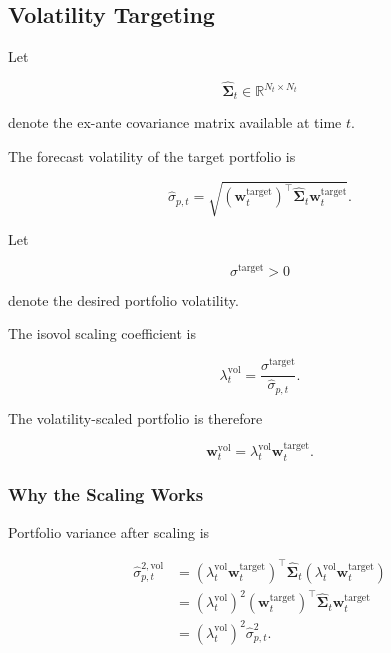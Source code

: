 \documentclass[11pt,a4paper]{article}
\begin{document}
\subsection{Volatility Targeting}
\label{subsec:portfolio_volatility_targeting}

Let

\begin{equation}
\widehat{\boldsymbol{\Sigma}}_t
\in
\mathbb{R}^{N_t\times N_t}
\end{equation}

denote the ex-ante covariance matrix available at time $t$.

The forecast volatility of the target portfolio is

\begin{equation}
\boxed{
\widehat{\sigma}_{p,t}
=
\sqrt{
\left(
\mathbf{w}_t^{\mathrm{target}}
\right)^\top
\widehat{\boldsymbol{\Sigma}}_t
\mathbf{w}_t^{\mathrm{target}}
}.
}
\end{equation}

Let

\begin{equation}
\sigma^{\mathrm{target}}>0
\end{equation}

denote the desired portfolio volatility.

The isovol scaling coefficient is

\begin{equation}
\boxed{
\lambda_t^{\mathrm{vol}}
=
\frac{
\sigma^{\mathrm{target}}
}{
\widehat{\sigma}_{p,t}
}.
}
\end{equation}

The volatility-scaled portfolio is therefore

\begin{equation}
\boxed{
\mathbf{w}_t^{\mathrm{vol}}
=
\lambda_t^{\mathrm{vol}}
\mathbf{w}_t^{\mathrm{target}}.
}
\end{equation}


\subsubsection{Why the Scaling Works}

Portfolio variance after scaling is

\begin{equation}
\begin{aligned}
\widehat{\sigma}_{p,t}^{2,\mathrm{vol}}
&=
\left(
\lambda_t^{\mathrm{vol}}
\mathbf{w}_t^{\mathrm{target}}
\right)^\top
\widehat{\boldsymbol{\Sigma}}_t
\left(
\lambda_t^{\mathrm{vol}}
\mathbf{w}_t^{\mathrm{target}}
\right)
\\
&=
\left(
\lambda_t^{\mathrm{vol}}
\right)^2
\left(
\mathbf{w}_t^{\mathrm{target}}
\right)^\top
\widehat{\boldsymbol{\Sigma}}_t
\mathbf{w}_t^{\mathrm{target}}
\\
&=
\left(
\lambda_t^{\mathrm{vol}}
\right)^2
\widehat{\sigma}_{p,t}^{2}.
\end{aligned}
\end{equation}
\end{document}
